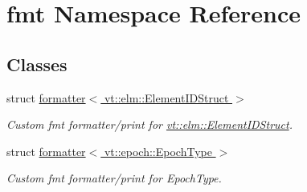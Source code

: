 \hypertarget{namespacefmt}{}\section{fmt Namespace Reference}
\label{namespacefmt}
\subsection*{Classes}
\begin{DoxyCompactItemize}
\item 
struct \hyperlink{structfmt_1_1formatter_3_01vt_1_1elm_1_1_element_i_d_struct_01_4}{formatter$<$ vt\+::elm\+::\+Element\+I\+D\+Struct $>$}
\begin{DoxyCompactList}\small\item\em Custom fmt formatter/print for {\ttfamily \hyperlink{structvt_1_1elm_1_1_element_i_d_struct}{vt\+::elm\+::\+Element\+I\+D\+Struct}}. \end{DoxyCompactList}\item 
struct \hyperlink{structfmt_1_1formatter_3_01vt_1_1epoch_1_1_epoch_type_01_4}{formatter$<$ vt\+::epoch\+::\+Epoch\+Type $>$}
\begin{DoxyCompactList}\small\item\em Custom fmt formatter/print for {\ttfamily Epoch\+Type}. \end{DoxyCompactList}\end{DoxyCompactItemize}
